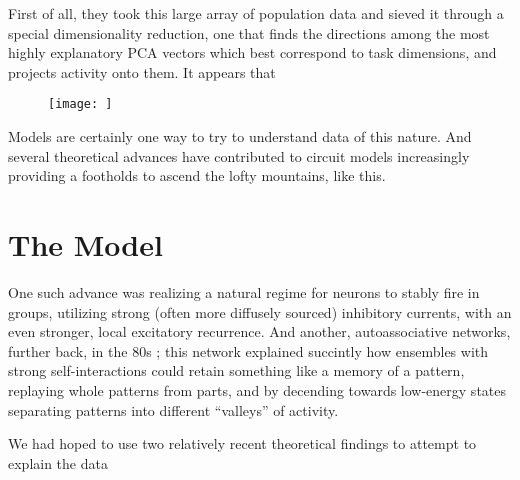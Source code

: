 \documentclass{report}
\begin{document}
First of all, they took this large array of population data and sieved it through a special dimensionality reduction, one that finds the directions among the most highly explanatory PCA vectors which best correspond to task dimensions, and projects activity onto them. It appears that

\begin{figure}[h!]
  \texttt{[image: ]}
  \caption{}
  \label{fig:attractor}
\end{figure}

Models are certainly one way to try to understand data of this nature. And several theoretical advances have contributed to circuit models increasingly providing a footholds to ascend the lofty mountains, like this. 

\section{The Model}

One such advance \cite{tsodyks_paradoxical_1997} was realizing a natural regime for neurons to stably fire in groups, utilizing strong (often more diffusely sourced) inhibitory currents, with an even stronger, local excitatory recurrence. And another, autoassociative networks, further back, in the 80s \cite{hopfield_neural_1982}; this network explained succintly how ensembles with strong self-interactions could retain something like a memory of a pattern, replaying whole patterns from parts, and by decending towards low-energy states separating patterns into different ``valleys'' of activity.

We had hoped to use two relatively recent theoretical findings to attempt to explain the data 



\end{document}
